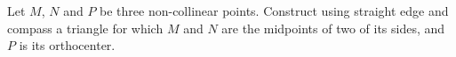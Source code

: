 Let $M$,  $N$ and $P$ be three non-collinear points. Construct using straight edge and compass a triangle for which $M$ and $N$ are the midpoints of two of its sides, and $P$ is its orthocenter.